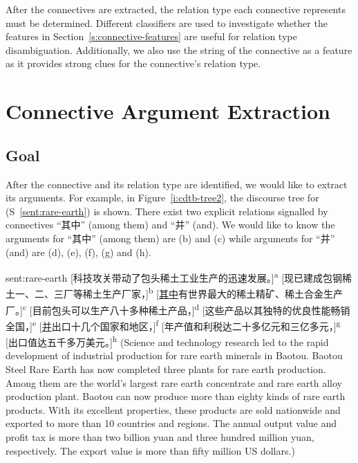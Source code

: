 After the connectives are extracted, the relation type each connective represents
must be determined. Different classifiers are used to investigate whether the features in
Section~\ref{s:connective-features} are useful for relation type disambiguation.
Additionally, we also use the string of the connective as a feature as it provides strong
clues for the connective's relation type.

\section{Connective Argument Extraction}

\subsection{Goal}

After the connective and its relation type are identified, we would like to extract
its arguments. For example, in Figure~\ref{i:cdtb-tree2}, the discourse tree
for (S~\ref{sent:rare-earth}) is shown. There exist two explicit relations signalled by
connectives ``其中'' (among them) and ``并'' (and). We would like to know the
arguments for ``其中'' (among them) are (b) and (c) while arguments for ``并'' (and) are
(d), (e), (f), (g) and (h).



\begin{sent}{sent:rare-earth}{}
    [科技攻关带动了包头稀土工业生产的迅速发展。]\textsuperscript{a}
    [现已建成包钢稀土一、二、三厂等稀土生产厂家，]\textsuperscript{b}
    [\underline{其中}有世界最大的稀土精矿、稀土合金生产厂。]\textsuperscript{c}
    [目前包头可以生产八十多种稀土产品，]\textsuperscript{d}
    [这些产品以其独特的优良性能畅销全国，]\textsuperscript{e}
    [\underline{并}出口十几个国家和地区，]\textsuperscript{f}
    [年产值和利税达二十多亿元和三亿多元，]\textsuperscript{g}
    [出口值达五千多万美元。]\textsuperscript{h}
    (Science and technology research led to the rapid development of industrial production
    for rare earth minerals in Baotou. Baotou Steel Rare Earth has now completed three
    plants for rare earth production. Among them are the world's largest rare earth
    concentrate and rare earth alloy production plant. Baotou can now produce more than
    eighty kinds of rare earth products. With its excellent properties, these products
    are sold nationwide and exported to more than 10 countries and regions.
    The annual output value and profit tax is more
    than two billion yuan and three hundred million yuan, respectively.
    The export value is more than fifty million US dollars.)
\end{sent}

